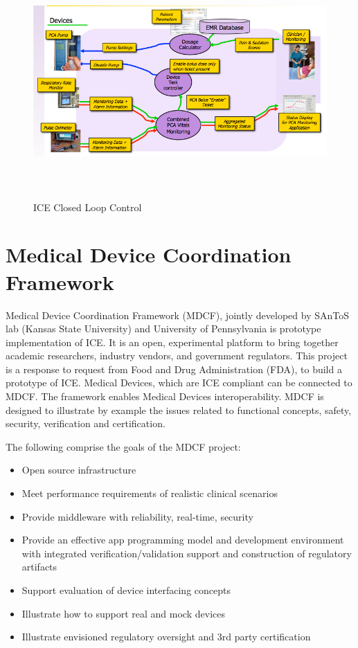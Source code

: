 \begin{figure}[ht]%
    \begin{center}
    	\includegraphics[height=3.5in]{figures/ice.png}   	
    \end{center}
    \caption{ICE Closed Loop Control}
    \label{figure:ice}
\end{figure}


\section{Medical Device Coordination Framework}
\label{background:mdcf}

Medical Device Coordination Framework (MDCF), jointly developed by SAnToS lab (Kansas State University) and University of Pennsylvania is prototype implementation of ICE. It is an open, experimental platform to bring together academic researchers, industry vendors, and government regulators. This project is a response to request from Food and Drug Administration (FDA), to build a prototype of ICE. Medical Devices, which are ICE compliant can be connected to MDCF. The framework enables Medical Devices interoperability. MDCF is designed to illustrate by example the issues related to functional concepts, safety, security, verification and certification. 

The following comprise the goals of the MDCF project:
\begin{itemize}
	\item Open source infrastructure
	\item Meet performance requirements of realistic clinical scenarios
	\item Provide middleware with reliability, real-time, security
	\item Provide an effective app programming model and development environment with integrated verification/validation support and construction of regulatory artifacts
	\item Support evaluation of device interfacing concepts
	\item Illustrate how to support real and mock devices
	\item Illustrate envisioned regulatory oversight and 3rd party certification
\end{itemize}


